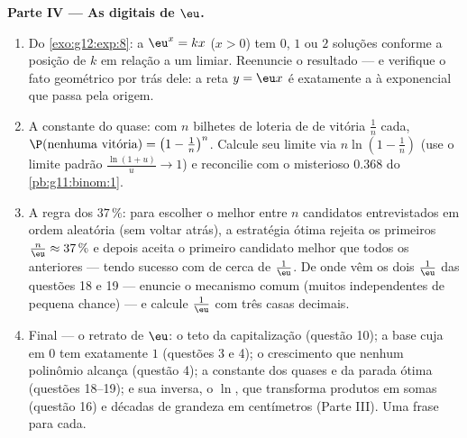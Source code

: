 \begin{problem}
\medskip
\noindent\textbf{Parte IV --- As digitais de $\eu$.}
\begin{enumerate}[resume]
  \item Do \cref{exo:g12:exp:8}: a  $\eu^x = kx$
        ($x > 0$) tem $0$, $1$ ou $2$ soluções conforme a posição
        de $k$ em relação a um limiar. Reenuncie o resultado ---
        e verifique o fato geométrico por trás dele: a reta
        $y = \eu x$ é exatamente a  à exponencial que
        passa pela origem.
  \item A constante do quase: com $n$ bilhetes de loteria de
         de vitória $\frac1n$ cada,
        $\P(\text{nenhuma vitória}) = \left(1 -
        \frac1n\right)^n$. Calcule seu limite via
        $n \ln\!\left(1 - \frac1n\right)$ (use o limite padrão
        $\frac{\ln(1 + u)}{u} \to 1$) e reconcilie com o
        misterioso $0.368$ do \cref{pb:g11:binom:1}.
  \item A regra dos $37\,\%$: para escolher o melhor entre $n$
        candidatos entrevistados em ordem aleatória (sem voltar
        atrás), a estratégia ótima rejeita os primeiros
        $\frac{n}{\eu} \approx 37\,\%$ e depois aceita o
        primeiro candidato melhor que todos os anteriores ---
        tendo sucesso com  de cerca de
        $\frac1\eu$. De onde vêm os dois $\frac1\eu$ das questões
        18 e 19 --- enuncie o mecanismo comum (muitos 
        independentes de pequena chance) --- e calcule
        $\frac1\eu$ com três casas decimais.
  \item Final --- o retrato de $\eu$: o teto da capitalização
        (questão 10); a base cuja  em $0$ tem  exatamente $1$ (questões 3 e 4); o crescimento
        que nenhum polinômio alcança (questão 4); a constante dos
        quases e da parada ótima (questões 18--19); e sua
        inversa, o $\ln$, que transforma produtos em somas
        (questão 16) e décadas de grandeza em centímetros (Parte
        III). Uma frase para cada.
\end{enumerate}
\end{problem}
